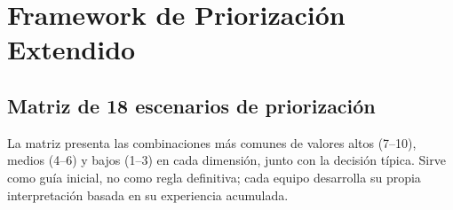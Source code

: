 \chapter{Framework de Priorización Extendido}
\label{anexo:framework-priorizacion-extendido}

\setlength{\parindent}{0pt}

\section{Matriz de 18 escenarios de priorización}

La matriz presenta las combinaciones más comunes de valores altos (7--10), medios (4--6) y bajos (1--3) en cada dimensión, junto con la decisión típica. Sirve como guía inicial, no como regla definitiva; cada equipo desarrolla su propia interpretación basada en su experiencia acumulada.

\begingroup
\scriptsize
\renewcommand{\arraystretch}{1.4}
\setlength{\tabcolsep}{4pt}
\setlength{\LTleft}{0pt}
\setlength{\LTright}{0pt}

